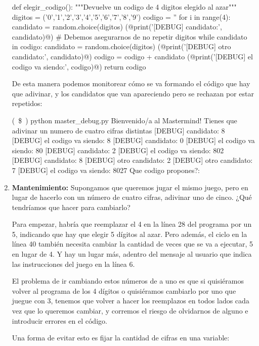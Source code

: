 \begin{enumerate}
\begin{codigo-python-sn}
def elegir_codigo():
    """Devuelve un codigo de 4 digitos elegido al azar"""
    digitos = ('0','1','2','3','4','5','6','7','8','9')
    codigo = ''
    for i in range(4):
        candidato = random.choice(digitos)
        (@print('[DEBUG] candidato:', candidato)@)
        # Debemos asegurarnos de no repetir digitos
        while candidato in codigo:
            candidato = random.choice(digitos)
            (@print('[DEBUG] otro candidato:', candidato)@)
        codigo = codigo + candidato
        (@print('[DEBUG] el codigo va siendo:', codigo)@)
    return codigo
\end{codigo-python-sn}

De esta manera podemos monitorear cómo se va formando el código que hay que
adivinar, y los candidatos que van apareciendo pero se rechazan por estar
repetidos:

\begin{codigo-nohl-sn}
(~\$~) python master_debug.py
Bienvenido/a al Mastermind!
Tienes que adivinar un numero de cuatro cifras distintas
[DEBUG] candidato: 8
[DEBUG] el codigo va siendo: 8
[DEBUG] candidato: 0
[DEBUG] el codigo va siendo: 80
[DEBUG] candidato: 2
[DEBUG] el codigo va siendo: 802
[DEBUG] candidato: 8
[DEBUG] otro candidato: 2
[DEBUG] otro candidato: 7
[DEBUG] el codigo va siendo: 8027
Que codigo propones?:
\end{codigo-nohl-sn}

\item {\bf Mantenimiento:}
\label{str:mant}
Supongamos que queremos jugar el mismo juego, pero en lugar de hacerlo con un
número de cuatro cifras, adivinar uno de cinco. ¿Qué tendríamos que hacer para
cambiarlo?

Para empezar, habría que reemplazar el 4 en la línea 28 del programa por un
5, indicando que hay que elegir 5 dígitos al azar. Pero además, el ciclo en la
línea 40 también necesita cambiar la cantidad de veces que se va a ejecutar, 5
en lugar de 4. Y hay un lugar más, adentro del mensaje al usuario que indica las
instrucciones del juego en la línea 6.

El problema de ir cambiando estos números de a uno es que si quisiéramos volver
al programa de los 4 dígitos o quisiéramos cambiarlo por uno que juegue con 3,
tenemos que volver a hacer los reemplazos en todos lados cada vez que lo
queremos cambiar, y corremos el riesgo de olvidarnos de alguno e introducir
errores en el código.

Una forma de evitar esto es fijar la cantidad de cifras en una variable:


\end{enumerate}
